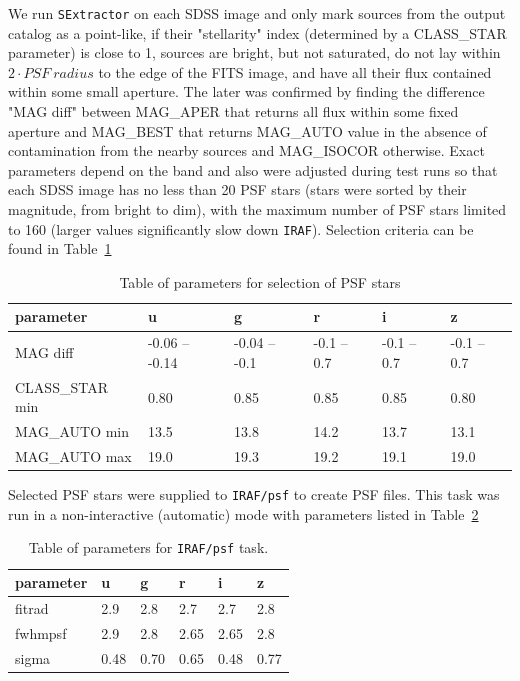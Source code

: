 We run {\tt SExtractor} on each SDSS image and only mark sources from the output catalog as a point-like, if their "stellarity" index (determined by a CLASS\_STAR parameter) is close to 1, sources are bright, but not saturated, do not lay within $2 \cdot PSF~radius$ to the edge of the FITS image, and have all their flux contained within some small aperture. The later was confirmed by finding the difference "MAG diff" between MAG\_APER that returns all flux within some fixed aperture and MAG\_BEST that returns MAG\_AUTO value in the absence of contamination from the nearby sources and MAG\_ISOCOR otherwise. Exact parameters depend on the band and also were adjusted during test runs so that each SDSS image has no less than 20 PSF stars (stars were sorted by their magnitude, from bright to dim), with the maximum number of PSF stars limited to 160 (larger values significantly slow down {\tt IRAF}). Selection criteria can be found in Table~\ref{tab:psf_star}

\begin{table}[h!]
  \begin{center}
    \caption{Table of parameters for selection of PSF stars}
    \label{tab:psf_star}
    \begin{tabular}{l|l|l|l|l|l} %
      \textbf{parameter} & \textbf{u} & \textbf{g} & \textbf{r} & \textbf{i} & \textbf{z}\\
      \hline
      MAG diff & -0.06 -- -0.14 & -0.04 -- -0.1 & -0.1 -- 0.7 & -0.1 -- 0.7 & -0.1 -- 0.7\\
      CLASS\_STAR min & 0.80 & 0.85 & 0.85 & 0.85 & 0.80\\
      MAG\_AUTO min   & 13.5 & 13.8 & 14.2 & 13.7 & 13.1\\
      MAG\_AUTO max   & 19.0 & 19.3 & 19.2 & 19.1 & 19.0\\
    \end{tabular}
  \end{center}
\end{table}

Selected PSF stars were supplied to {\tt IRAF/psf} to create PSF files. This task was run in a non-interactive (automatic) mode with parameters listed in Table~\ref{tab:table2}

\begin{table}[h!]
  \begin{center}
    \caption{Table of parameters for {\tt IRAF/psf} task.}
    \label{tab:table2}
    \begin{tabular}{l|l|l|l|l|l} %
      \textbf{parameter} & \textbf{u} & \textbf{g} & \textbf{r} & \textbf{i} & \textbf{z}\\
      \hline
      fitrad & 2.9 & 2.8 & 2.7 & 2.7 & 2.8\\
      fwhmpsf & 2.9 & 2.8 & 2.65 & 2.65 & 2.8\\
      sigma & 0.48 & 0.70 & 0.65 & 0.48 & 0.77\\
    \end{tabular}
  \end{center}
\end{table}

